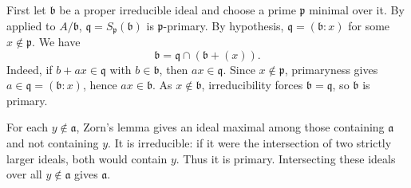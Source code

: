 First let $\mathfrak{b}$ be a proper irreducible ideal and choose a prime $\mathfrak{p}$ minimal over it. By  applied to $A/\mathfrak{b}$, $\mathfrak{q}=S_{\mathfrak{p}}(\mathfrak{b})$ is $\mathfrak{p}$-primary. By hypothesis, $\mathfrak{q}=(\mathfrak{b}:x)$ for some $x\notin\mathfrak{p}$. We have
\[\mathfrak{b}=\mathfrak{q}\cap(\mathfrak{b}+(x)).\]
Indeed, if $b+ax\in\mathfrak{q}$ with $b\in\mathfrak{b}$, then $ax\in\mathfrak{q}$. Since $x\notin\mathfrak{p}$, primaryness gives $a\in\mathfrak{q}=(\mathfrak{b}:x)$, hence $ax\in\mathfrak{b}$. As $x\notin\mathfrak{b}$, irreducibility forces $\mathfrak{b}=\mathfrak{q}$, so $\mathfrak{b}$ is primary.

For each $y\notin\mathfrak{a}$, Zorn's lemma gives an ideal maximal among those containing $\mathfrak{a}$ and not containing $y$. It is irreducible: if it were the intersection of two strictly larger ideals, both would contain $y$. Thus it is primary. Intersecting these ideals over all $y\notin\mathfrak{a}$ gives $\mathfrak{a}$.
